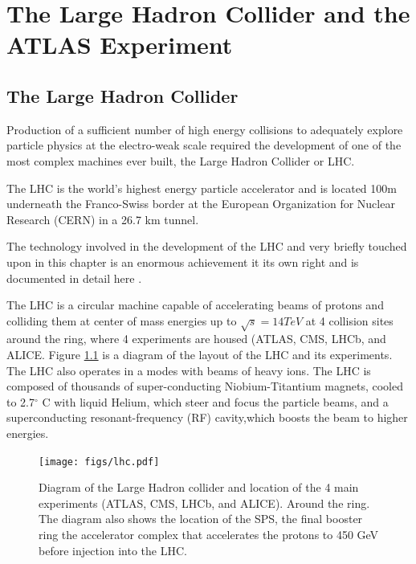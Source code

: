\chapter[The Large Hadron Collider and the ATLAS Experiment][The Large Hadron Collider and the ATLAS Experiment]{The Large Hadron Collider and the ATLAS Experiment}
\label{chapter:lhc}
\section{The Large Hadron Collider}


Production of a sufficient number of high energy collisions to adequately explore
particle physics at the electro-weak scale required the development of one
of the most complex machines ever built, the Large Hadron Collider or LHC. 

The LHC is the world's highest energy particle accelerator 
and is located 100m underneath the Franco-Swiss border at the European Organization
for Nuclear Research (CERN) in a 26.7 km tunnel. 


The technology involved in the development of the LHC and very briefly
touched upon in this chapter is an enormous achievement
it its own right and is documented in detail here \cite{1748-0221-3-08-S08001,Pettersson:291782,Linnecar:1176380}. 


The LHC is a circular 
machine capable of accelerating beams of protons and colliding them at center of mass 
energies up to $\sqrt{s} = 14 TeV$ at 4 collision sites around the ring, where 4 experiments
are housed (ATLAS\cite{ATLAS_detector}, CMS\cite{1748-0221-3-08-S08004}, LHCb\cite{1748-0221-3-08-S08005}, and ALICE\cite{1748-0221-3-08-S08002}. Figure \ref{figure:lhc_lhc} is a diagram
of the layout of the LHC and its experiments\cite{Team:40525}. The LHC also operates in a modes with beams of 
heavy ions. The LHC is composed of thousands of super-conducting Niobium-Titantium 
magnets, cooled to 2.7$^\circ$ C with liquid Helium, which steer and focus the 
particle beams, and a superconducting resonant-frequency (RF) cavity,which boosts the beam
to higher energies. 

\begin{figure}[!t]
\centering 
\texttt{[image: figs/lhc.pdf]}
\caption{ Diagram of the Large Hadron collider and location of the 4 main experiments (ATLAS, CMS, LHCb, and ALICE). Around
  the ring. The diagram also shows the location of the SPS, the final booster ring the accelerator complex that accelerates
    the protons to 450 GeV before injection into the LHC. 
}
\label{figure:lhc_lhc}
\end{figure}




